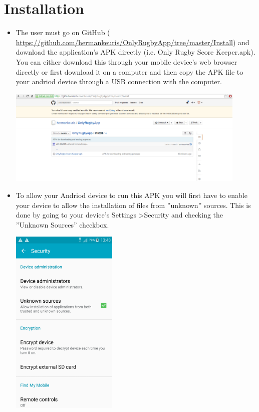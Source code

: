 \documentclass[hidelinks,a4paper,12pt]{article}
\begin{document}
\newpage

\section{Installation}
\begin {itemize}
	\item The user must go on GitHub ( \url {https://github.com/hermankeuris/OnlyRugbyApp/tree/master/Install}) and download the application's APK directly (i.e. Only Rugby Score Keeper.apk). You can either download this through your mobile device's web browser directly or first download it on a computer and then copy the APK file to your andriod device through a USB connection with the computer.
	\begin{center}
  		 \includegraphics[width=0.9\textwidth] {./images/APKdownload.png}\\[0.4cm]
	\end{center}
	\item To allow your Andriod device to run this APK you will first have to enable your device to allow the installation of files from ''unknown'' sources. This is done by going to your device's Settings \textgreater  Security and checking the ''Unknown Sources'' checkbox.
	\begin{center}
  		 \includegraphics[width=0.4\textwidth] {./images/unknownsources.png}\\[0.4cm]

\end{center}
\end{itemize}
\end{document}
